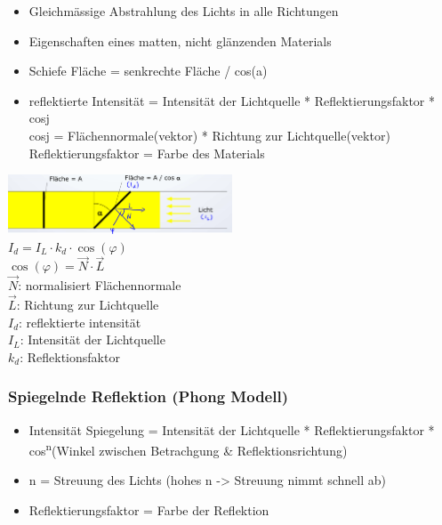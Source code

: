 \begin{itemize}
    \item Gleichmässige Abstrahlung des Lichts in alle Richtungen
    \item Eigenschaften eines matten, nicht glänzenden Materials
    \item Schiefe Fläche = senkrechte Fläche / cos(a)
    \item reflektierte Intensität = Intensität der Lichtquelle * Reflektierungsfaktor * cosj \\
    cosj = Flächennormale(vektor) * Richtung zur Lichtquelle(vektor) \\
    Reflektierungsfaktor = Farbe des Materials
\end{itemize}

\includegraphics[width=0.5\textwidth]{assets/energy-model.png}\\

$I_d = I_L \cdot k_d \cdot \cos(\varphi)$ \\
$\cos(\varphi) = \vec{N} \cdot \vec{L}$ \\

$\vec{N}$: normalisiert Flächennormale \\
$\vec{L}$: Richtung zur Lichtquelle \\
$I_d$: reflektierte intensität \\
$I_L$: Intensität der Lichtquelle \\
$k_d$: Reflektionsfaktor \\

\subsubsection{Spiegelnde Reflektion (Phong Modell)}

\begin{itemize}
    \item[] Intensität Spiegelung = Intensität der Lichtquelle * Reflektierungsfaktor * cos\textsuperscript{n}(Winkel zwischen Betrachgung \& Reflektionsrichtung)
    \item[] n = Streuung des Lichts (hohes n -> Streuung nimmt schnell ab)
    \item[] Reflektierungsfaktor = Farbe der Reflektion
\end{itemize}


